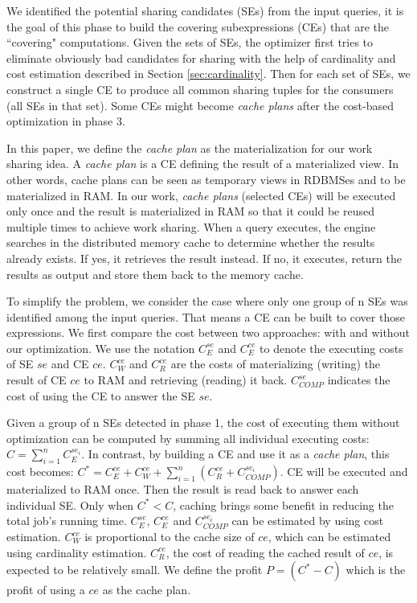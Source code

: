 We identified the potential sharing candidates (SEs) from the input queries, it is the goal of this phase to build the covering subexpressions (CEs) that are the ``covering" computations. Given the sets of SEs, the optimizer first tries to eliminate obviously bad candidates for sharing with the help of cardinality and cost estimation described in Section \ref{sec:cardinality}. Then for each set of SEs, we construct a single CE to produce all common sharing tuples for the consumers (all SEs in that set). Some CEs might become \emph{cache plans} after the cost-based optimization in phase 3. 

In this paper, we define the \emph{cache plan} as the materialization for our work sharing idea. A \emph{cache plan} is a CE defining the result of a materialized view. In other words, cache plans can be seen as temporary views in RDBMSes and to be materialized in RAM. In our work, \emph{cache plans} (selected CEs) will be executed only once and the result is materialized in RAM so that it could be reused multiple times to achieve work sharing. When a query executes, the engine searches in the distributed memory cache to determine whether the results already exists. If yes, it retrieves the result instead. If no, it executes, return the results as output and store them back to the memory cache.

To simplify the problem, we consider the case where only one group of n SEs was identified among the input queries. That means a CE can be built to cover those expressions. We first compare the cost between two approaches: with and without our optimization. We use the notation $C_{E}^{se}$ and $C_{E}^{ce}$ to denote the executing costs of SE $se$ and CE $ce$. $C_{W}^{ce}$ and $C_{R}^{ce}$ are the costs of materializing (writing) the result of CE $ce$ to RAM and retrieving (reading) it back. $C_{COMP}^{se}$ indicates the cost of using the CE to answer the SE $se$.

Given a group of n SEs detected in phase 1, the cost of executing them without optimization can be computed by summing all individual executing costs: $C = \sum _{i=1}^{n}C_{E}^{se_i}$. In contrast, by building a CE and use it as a \emph{cache plan}, this cost becomes: 
$C^* = C_{E}^{ce} + C_{W}^{ce} + \sum _{i=1}^{n}(C_{R}^{ce} + C_{COMP}^{se_i})$. 
CE will be executed and materialized to RAM once. Then the result is read back to answer each individual SE. Only when $C^* < C$, caching brings some benefit in reducing the total job's running time. $C_{E}^{se}$, $C_{E}^{ce}$ and $C_{COMP}^{se_i}$ can be estimated by using cost estimation. $C_{W}^{ce}$ is proportional to the cache size of $ce$, which can be estimated using cardinality estimation. $C_{R}^{ce}$, the cost of reading the cached result of $ce$, is expected to be relatively small. We define the profit $P = (C^*-C)$ which is the profit of using a $ce$ as the cache plan.

